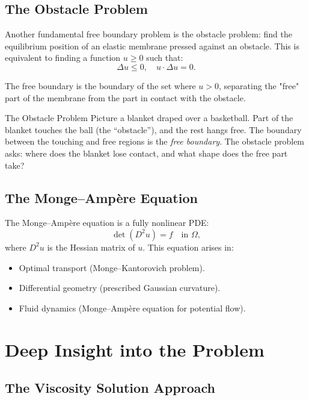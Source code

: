 \subsection{The Obstacle Problem}

Another fundamental free boundary problem is the obstacle problem: find the equilibrium position of an elastic membrane pressed against an obstacle. This is equivalent to finding a function $u \geq 0$ such that:
\[
\Delta u \leq 0,\quad u \cdot \Delta u = 0.
\]

The free boundary is the boundary of the set where $u > 0$, separating the "free" part of the membrane from the part in contact with the obstacle.

\begin{primer}{The Obstacle Problem}
Picture a blanket draped over a basketball. Part of the blanket touches the ball (the ``obstacle''), and the rest hangs free. The boundary between the touching and free regions is the \emph{free boundary}. The obstacle problem asks: where does the blanket lose contact, and what shape does the free part take?
\end{primer}

\subsection{The Monge--Amp\`ere Equation}

The Monge--Amp\`ere equation is a fully nonlinear PDE:
\[
\det(D^2 u) = f \quad \text{in } \Omega,
\]
where $D^2 u$ is the Hessian matrix of $u$. This equation arises in:
\begin{itemize}
\item Optimal transport (Monge--Kantorovich problem).
\item Differential geometry (prescribed Gaussian curvature).
\item Fluid dynamics (Monge--Amp\`ere equation for potential flow).
\end{itemize}

\section{Deep Insight into the Problem}

\subsection{The Viscosity Solution Approach}

